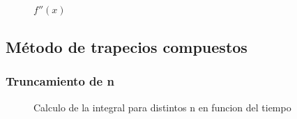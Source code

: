 \documentclass[11pt,a4paper]{article}
\begin{document}
\begin{figure}[H]
	\caption{\(f''(x)\)}
	\label{fig:funcionderivada2}
\end{figure}

\subsection{Método de trapecios compuestos}

\subsubsection{Truncamiento de n}

\begin{figure}[H]
	\caption{Calculo de la integral para distintos n en funcion del tiempo}
	\label{fig:calcularn}
\end{figure}
\end{document}
